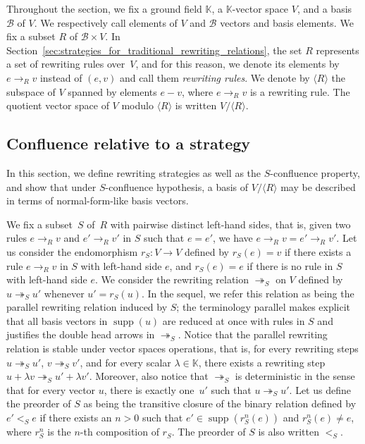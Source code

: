 \documentclass[11pt]{article}
\theoremstyle{definition}
\newcommand\basis{\mathscr{B}}
\newcommand\ordS{<_S}
\DeclareMathOperator{\supp}{supp}
\newcommand\K{\mathbb{K}}
\newcommand\Span[1]{\langle #1\rangle}
\newcommand\rewR{\to_R}
\newcommand\parS{\twoheadrightarrow_S}
\begin{document}
Throughout the section, we fix a ground field $\K$, a $\K$-vector space $V$, and
a basis $\basis$ of $V$. We respectively call elements of $V$ and $\basis$
vectors and basis elements. We fix a subset $R$ of $\basis\times V$. In
Section~\ref{sec:strategies_for_traditional_rewriting_relations}, the set $R$
represents a set of rewriting rules over~$V$, and for this reason, we denote its
elements by $e\rewR v$ instead of $(e,v)$ and call them \emph{rewriting
  rules}. We denote by $\Span{R}$ the subspace of $V$ spanned by elements $e-v$,
where $e\rewR v$ is a rewriting rule. The quotient vector space of $V$ modulo
$\Span{R}$ is written $V/\Span{R}$.

\subsection{Confluence relative to a strategy}
\label{sec:confluence_relative_to_a_strategy}

In this section, we define rewriting strategies as well as the $S$-confluence
property, and show that under $S$-confluence hypothesis, a basis of $V/\Span{R}$
may be described in terms of normal-form-like basis vectors.  \medskip


\medskip

We fix a subset~$S$ of~$R$ with pairwise distinct left-hand sides, that is,
given two rules $e\rewR v$ and $e'\rewR v'$ in $S$ such that $e=e'$, we have
$e\rewR v=e'\rewR v'$. Let us consider the endomorphism $r_S:V\to V$ defined by
$r_S(e)=v$ if there exists a rule $e\rewR v$ in $S$ with left-hand side $e$, and
$r_S(e)=e$ if there is no rule in $S$ with left-hand side $e$. We consider the
rewriting relation $\parS$ on $V$ defined by $u\parS u'$ whenever
$u'=r_S(u)$. In the sequel, we refer this relation as being the parallel
rewriting relation induced by $S$; the terminology parallel makes explicit that
all basis vectors in $\supp(u)$ are reduced at once with rules in $S$ and
justifies the double head arrows in $\parS$. Notice that the parallel rewriting
relation is stable under vector spaces operations, that is, for every rewriting
steps $u\parS u'$, $v\parS v'$, and for every scalar $\lambda\in\K$, there exists a
rewriting step $u+\lambda v\parS u'+\lambda v'$. Moreover, also notice that
$\parS$ is deterministic in the sense that for every vector $u$, there is
exactly one~$u'$ such that $u\parS u'$. Let us define the preorder of $S$ as
being the transitive closure of the binary relation defined by $e'\ordS e$ if
there exists an $n > 0$ such that $e'\in\supp(r_S^n(e))$ and $r_S^n(e) \neq e$, where
$r_S^n$ is the $n$-th composition of $r_S$. The preorder of $S$ is also
written $\ordS$.
\smallskip
\end{document}
